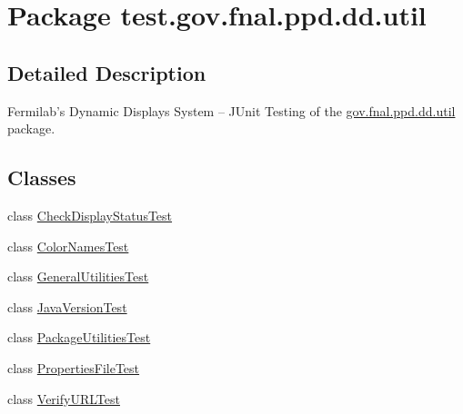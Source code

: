 \hypertarget{namespacetest_1_1gov_1_1fnal_1_1ppd_1_1dd_1_1util}{\section{Package test.\-gov.\-fnal.\-ppd.\-dd.\-util}
\label{namespacetest_1_1gov_1_1fnal_1_1ppd_1_1dd_1_1util}
}


\subsection{Detailed Description}
Fermilab's Dynamic Displays System -- J\-Unit Testing of the \hyperlink{namespacetest_1_1gov_1_1fnal_1_1ppd_1_1dd_1_1util}{gov.\-fnal.\-ppd.\-dd.\-util} package.\subsection*{Classes}
\begin{DoxyCompactItemize}
\item 
class \hyperlink{classtest_1_1gov_1_1fnal_1_1ppd_1_1dd_1_1util_1_1CheckDisplayStatusTest}{Check\-Display\-Status\-Test}
\item 
class \hyperlink{classtest_1_1gov_1_1fnal_1_1ppd_1_1dd_1_1util_1_1ColorNamesTest}{Color\-Names\-Test}
\item 
class \hyperlink{classtest_1_1gov_1_1fnal_1_1ppd_1_1dd_1_1util_1_1GeneralUtilitiesTest}{General\-Utilities\-Test}
\item 
class \hyperlink{classtest_1_1gov_1_1fnal_1_1ppd_1_1dd_1_1util_1_1JavaVersionTest}{Java\-Version\-Test}
\item 
class \hyperlink{classtest_1_1gov_1_1fnal_1_1ppd_1_1dd_1_1util_1_1PackageUtilitiesTest}{Package\-Utilities\-Test}
\item 
class \hyperlink{classtest_1_1gov_1_1fnal_1_1ppd_1_1dd_1_1util_1_1PropertiesFileTest}{Properties\-File\-Test}
\item 
class \hyperlink{classtest_1_1gov_1_1fnal_1_1ppd_1_1dd_1_1util_1_1VerifyURLTest}{Verify\-U\-R\-L\-Test}
\end{DoxyCompactItemize}
